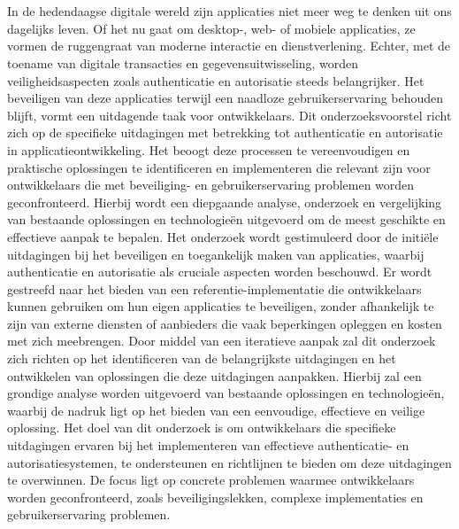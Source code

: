 
\chapter{}%
\label{ch:inleiding}

In de hedendaagse digitale wereld zijn applicaties niet meer weg te denken uit ons dagelijks leven. Of het nu gaat om desktop-, web- of mobiele applicaties, ze vormen de ruggengraat van moderne interactie 
en dienstverlening. Echter, met de toename van digitale transacties en gegevensuitwisseling, worden veiligheidsaspecten zoals authenticatie en autorisatie steeds belangrijker. Het beveiligen van deze applicaties 
terwijl een naadloze gebruikerservaring behouden blijft, vormt een uitdagende taak voor ontwikkelaars.
\newline
\newline
Dit onderzoeksvoorstel richt zich op de specifieke uitdagingen met betrekking tot authenticatie en autorisatie in applicatieontwikkeling. Het beoogt deze processen te vereenvoudigen en praktische oplossingen 
te identificeren en implementeren die relevant zijn voor ontwikkelaars die met beveiliging- en gebruikerservaring problemen worden geconfronteerd. Hierbij wordt een diepgaande analyse, onderzoek en 
vergelijking van bestaande oplossingen en technologieën uitgevoerd om de meest geschikte en effectieve aanpak te bepalen.
\newline
\newline
Het onderzoek wordt gestimuleerd door de initiële uitdagingen bij het beveiligen en toegankelijk maken van applicaties, waarbij authenticatie en autorisatie als cruciale aspecten worden beschouwd. 
Er wordt gestreefd naar het bieden van een referentie-implementatie die ontwikkelaars kunnen gebruiken om hun eigen applicaties te beveiligen, zonder afhankelijk te zijn van externe diensten of aanbieders die vaak beperkingen opleggen en kosten met zich meebrengen.
\newline
\newline
Door middel van een iteratieve aanpak zal dit onderzoek zich richten op het identificeren van de belangrijkste uitdagingen en het ontwikkelen van oplossingen die deze uitdagingen aanpakken. 
Hierbij zal een grondige analyse worden uitgevoerd van bestaande oplossingen en technologieën, waarbij de nadruk ligt op het bieden van een eenvoudige, effectieve en veilige oplossing.
\newline
\newline
Het doel van dit onderzoek is om ontwikkelaars die specifieke uitdagingen ervaren bij het implementeren van effectieve authenticatie- en autorisatiesystemen, te ondersteunen en richtlijnen te bieden om deze uitdagingen te overwinnen.
De focus ligt op concrete problemen waarmee ontwikkelaars worden geconfronteerd, zoals beveiligingslekken, complexe implementaties en gebruikerservaring problemen.


